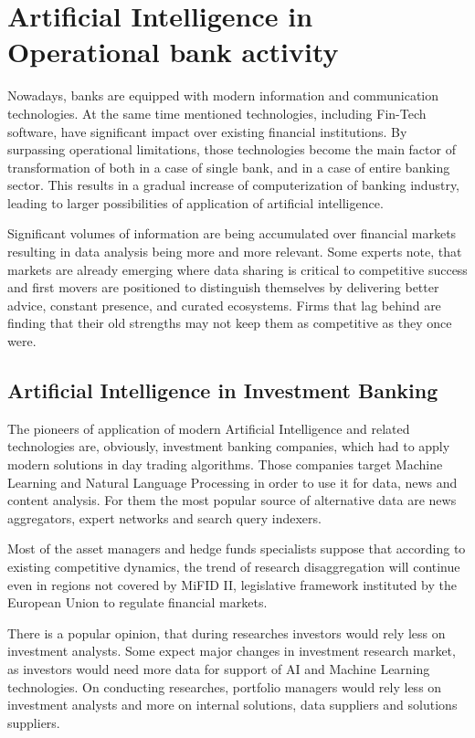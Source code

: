 

\section{Artificial Intelligence in Operational bank activity}

Nowadays, banks are equipped with modern information and communication technologies.
At the same time mentioned technologies, including Fin-Tech software, have significant impact over existing financial institutions.
By surpassing operational limitations, those technologies become the main factor of transformation of both in a case of single bank, and in a case of entire banking sector. 
This results in a gradual increase of computerization of banking industry, leading to larger possibilities of application of artificial intelligence.

Significant volumes of information are being accumulated over financial markets resulting in data analysis being more and more relevant.
Some experts note, that markets are already emerging where data sharing is critical to competitive success and first movers are positioned to distinguish themselves by delivering better advice, constant presence, and curated ecosystems. 
Firms that lag behind are finding that their old strengths may not keep them as competitive as they once were.
\cite{ai_transform_disrupt}


\subsection{Artificial Intelligence in Investment Banking}

The pioneers of application of modern Artificial Intelligence and related technologies are, obviously, investment banking companies, which had to apply modern solutions in day trading algorithms. 
Those companies target Machine Learning and Natural Language Processing in order to use it for data, news and content analysis.
For them the most popular source of alternative data are news aggregators, expert networks and search query indexers.

Most of the asset managers and hedge funds specialists suppose that according to existing competitive dynamics, the trend of research disaggregation will continue even in regions not covered by MiFID II, legislative framework instituted by the European Union to regulate financial markets.

There is a popular opinion, that during researches investors would rely less on investment analysts. 
Some expect major changes in investment research market, as investors would need more data for support of AI and Machine Learning technologies.
On conducting researches, portfolio managers would rely less on investment analysts and more on internal solutions, data suppliers and solutions suppliers.
\cite{future_of_trading_technology_2024}



